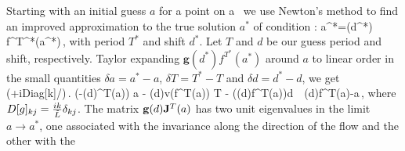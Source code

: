 Starting with an initial guess $a$ for a point on a \rpo\ we use Newton's method to find an improved approximation to the true solution $a^*$ of condition  :
\beq
	a^*=(d^*)  f^{T^*}(a^*)\,,
	\label{eq:RPOcond}
\eeq
with period $T^*$ and shift $d^*$. Let $T$ and $d$ be our guess period and shift, respectively. 
Taylor expanding $\mathbf{g}(d^*)  f^{T^*}(a^*)$ around $a$ to linear order in the small quantities 
$\delta a=a^*-a$, $\delta T=T^*-T$ and $\delta d=d^*-d$, we get
% 
% 
			(+i\mbox{Diag}[k]\Delta\kappa/\tildeL)\,.
% 
\beq
	\left(-(d)\J^{T}(a)\right) \delta a - (d)v(f^{T}(a)) \delta T 
							- ((d)f^{T}(a))\delta d  
					\,\simeq\, (d)f^{T}(a)-a\,,
	\label{eq:NewtonBasicCond}			
\eeq
where $D[g]_{kj}=\frac{ik}{\tilde{L}}\delta_{kj}$. The matrix $\mathbf{g}(d)\mathbf{J}^{T}(a)$ has two unit eigenvalues in 
the limit $a\rightarrow a^*$, one associated with the invariance along the direction of the flow and the other with the
